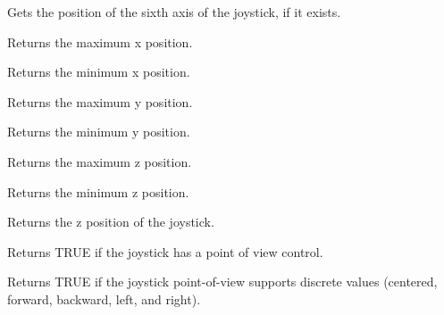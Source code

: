 Gets the position of the sixth axis of the joystick, if it exists.

\label{wxjoystickgetxmax}


Returns the maximum x position.

\label{wxjoystickgetxmin}


Returns the minimum x position.

\label{wxjoystickgetymax}


Returns the maximum y position.

\label{wxjoystickgetymin}


Returns the minimum y position.

\label{wxjoystickgetzmax}


Returns the maximum z position.

\label{wxjoystickgetzmin}


Returns the minimum z position.

\label{wxjoystickgetzposition}


Returns the z position of the joystick.

\label{wxjoystickhaspov}


Returns TRUE if the joystick has a point of view control.

\label{wxjoystickhaspovfdir}


Returns TRUE if the joystick point-of-view supports discrete values (centered, forward, backward, left, and right).

\label{wxjoystickhaspovcts}


